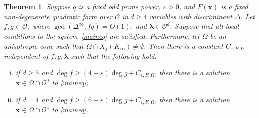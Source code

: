 \documentclass[10pt]{amsart}
\theoremstyle{plain}
\theoremstyle{plain}
\newtheorem{theorem}{Theorem}[section]
\renewcommand{\vec}[1]{\mathbf{#1}}
\theoremstyle{remark}
\theoremstyle{definition}
\newcommand{\Ki}{K_\infty}
\begin{document}
\begin{theorem}
\label{mainthm}Suppose $q$ is a fixed odd prime power, $\varepsilon>0$, and  $F(\vec{x})$ is a fixed non-degenerate quadratic form over $\mathcal{O}$ in $d\geq 4$ variables with discriminant $\Delta$.  Let $f, g\in\mathcal{O},$ where $\gcd(\Delta^{\infty},fg)=O(1),$ and $\boldsymbol{\lambda}\in\mathcal{O}^d.$  Suppose that  all local conditions to the system~\eqref{maineq} are satisfied. Furthermore, let  $\Omega$ be an anisotropic cone such that $\Omega\cap X_f(\Ki)\neq\emptyset$.  Then there is a constant $C_{\varepsilon,F,\Omega}$ independent of $f,g,\boldsymbol{\lambda}$ such that the following hold:
\begin{enumerate}[(i)]
\item \label{mainthmpart1}if $d\geq 5$ and $\deg f \geq (4+\varepsilon)\deg g +C_{\varepsilon,F,\Omega}$, then  there is a solution $\vec{x} \in \Omega\cap\mathcal{O}^d $ to \eqref{maineq};
\\
\item if $d=4$ and $\deg f \geq (6+\varepsilon)\deg g +C_{\varepsilon,F,\Omega}$, then there is a solution $\vec{x} \in \Omega\cap\mathcal{O}^4 $ to \eqref{maineq}.
\end{enumerate}
\end{theorem}
\end{document}
